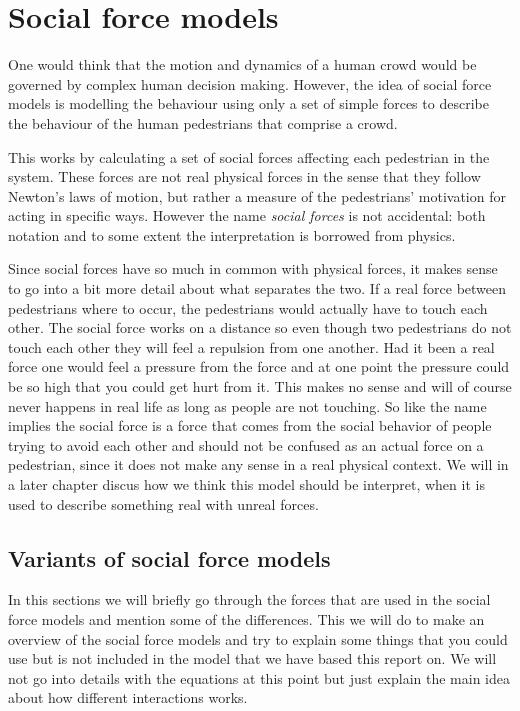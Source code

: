 \section{Social force models}
\label{sec:social-forces}
One would think that the motion and dynamics of a human crowd would be 
governed by complex human decision making. However, the idea of social force 
models is modelling the behaviour using only a set of simple forces to 
describe the behaviour of the human pedestrians that comprise a crowd.

This works by calculating a set of social forces affecting each pedestrian in the system.
These forces are not real physical forces in the sense 
that they follow Newton's laws of motion, but rather a measure of the pedestrians' 
motivation for acting in specific ways. However the name \emph{social forces} 
is not accidental: both notation and to some extent the interpretation is 
borrowed from physics. 

Since social forces have so much in common with physical forces, it makes 
sense to go into a bit more detail about what separates the two. If a real
force between pedestrians where to occur, the pedestrians would actually have
to touch each other. The social force works on a distance so even though
two pedestrians do not touch each other they will feel a repulsion from one another. Had it been a real force one
would feel a pressure from the force and at one point the pressure could be
so high that you could get hurt from it. This makes no sense and will of course
never happens in real life as long as people are not touching. So like the name
implies the social force is a force that comes from the social behavior of people
trying to avoid each other and should not be confused as an actual force on a pedestrian,
since it does not make any sense in a real physical context.  We will in a later chapter discus
 how we think this model should be interpret, when it is used to describe something real with unreal forces.   


\subsection{Variants of social force models}
In this sections we will briefly go through the forces that are used in the social force models
and mention some of the differences. This we will do to make an overview of the social force models
and try to explain some things that you could use but is not included in the model that we have
based this report on. We will not go into details with the equations at this point but just explain
the main idea about how different interactions works. 

